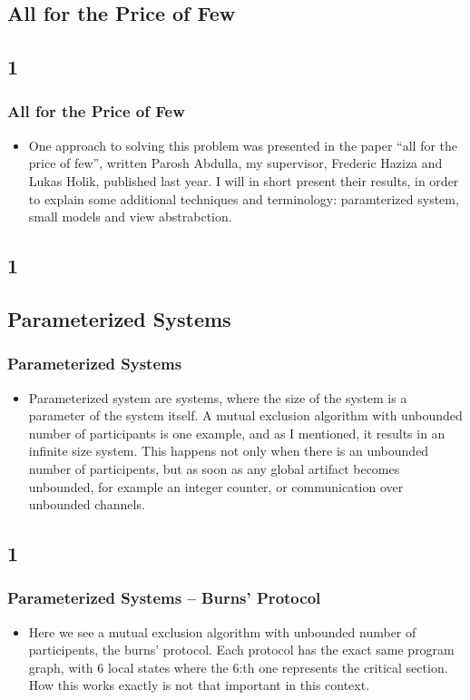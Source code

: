 \documentclass[handout]{beamer}
\begin{document}
\begin{footnotesize}
\section{All for the Price of Few}
\subsection*{1}
\begin{frame}
  \frametitle{All for the Price of Few}
  \begin{itemize}
\item
One approach to solving this problem was presented in the paper ``all for the price of few'', written Parosh Abdulla, my supervisor, Frederic Haziza and Lukas Holik, published last year. I will in short present their results, in order to explain some additional techniques and terminology: paramterized system, small models and view abstrabction.
  \end{itemize}
\end{frame}

\subsection*{1}
\subsection{Parameterized Systems}
\begin{frame}
  \frametitle{Parameterized Systems}
  \begin{itemize}
  \item
  Parameterized system are systems, where the size of the system is a parameter of the system itself. A mutual exclusion algorithm with unbounded number of participants is one example, and as I mentioned, it results in an infinite size system. This happens not only when there is an unbounded number of participents, but as soon as any global artifact becomes unbounded, for example an integer counter, or communication over unbounded channels.

  \end{itemize}
\end{frame}

\subsection*{1}
\begin{frame}
  \frametitle{Parameterized Systems -- Burns' Protocol}
\begin{itemize}
\item
Here we see a mutual exclusion algorithm with unbounded number of participents, the burns' protocol. Each protocol has the exact same program graph, with 6 local states where the 6:th one represents the critical section. How this works exactly is not that important in this context.


\end{itemize}
\end{frame}
\end{footnotesize}
\end{document}
